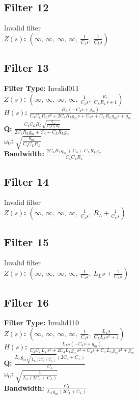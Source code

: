 \documentclass{article}
\begin{document}
\subsection*{Filter 12}
Invalid filter \\ 
\textbf{$Z(s)$:} $\left( \infty, \  \infty, \  \infty, \  \infty, \  \frac{1}{C_{4} s}, \  \frac{1}{C_{L} s}\right)$ \\ 
\subsection*{Filter 13}
\textbf{Filter Type:} Invalid011 \\ 
\textbf{$Z(s)$:} $\left( \infty, \  \infty, \  \infty, \  \infty, \  \frac{1}{C_{4} s}, \  \frac{R_{L}}{C_{L} R_{L} s + 1}\right)$ \\ 
\textbf{$H(s)$:} $\frac{R_{L} \left(- C_{4} s + g_{m}\right)}{C_{4} C_{L} R_{L} s^{2} + 2 C_{4} R_{L} g_{m} s + C_{4} s + C_{L} R_{L} g_{m} s + g_{m}}$ \\ 
\textbf{Q:} $\frac{C_{4} C_{L} R_{L} \sqrt{\frac{g_{m}}{C_{4} C_{L} R_{L}}}}{2 C_{4} R_{L} g_{m} + C_{4} + C_{L} R_{L} g_{m}}$ \\ 
\textbf{$\omega_0$:} $\sqrt{\frac{g_{m}}{C_{4} C_{L} R_{L}}}$ \\ 
\textbf{Bandwidth:} $\frac{2 C_{4} R_{L} g_{m} + C_{4} + C_{L} R_{L} g_{m}}{C_{4} C_{L} R_{L}}$ \\ 
\subsection*{Filter 14}
Invalid filter \\ 
\textbf{$Z(s)$:} $\left( \infty, \  \infty, \  \infty, \  \infty, \  \frac{1}{C_{4} s}, \  R_{L} + \frac{1}{C_{L} s}\right)$ \\ 
\subsection*{Filter 15}
Invalid filter \\ 
\textbf{$Z(s)$:} $\left( \infty, \  \infty, \  \infty, \  \infty, \  \frac{1}{C_{4} s}, \  L_{L} s + \frac{1}{C_{L} s}\right)$ \\ 
\subsection*{Filter 16}
\textbf{Filter Type:} Invalid110 \\ 
\textbf{$Z(s)$:} $\left( \infty, \  \infty, \  \infty, \  \infty, \  \frac{1}{C_{4} s}, \  \frac{L_{L} s}{C_{L} L_{L} s^{2} + 1}\right)$ \\ 
\textbf{$H(s)$:} $\frac{L_{L} s \left(- C_{4} s + g_{m}\right)}{C_{4} C_{L} L_{L} s^{3} + 2 C_{4} L_{L} g_{m} s^{2} + C_{4} s + C_{L} L_{L} g_{m} s^{2} + g_{m}}$ \\ 
\textbf{Q:} $\frac{L_{L} g_{m} \sqrt{\frac{1}{L_{L} \left(2 C_{4} + C_{L}\right)}} \left(2 C_{4} + C_{L}\right)}{C_{4}}$ \\ 
\textbf{$\omega_0$:} $\sqrt{\frac{1}{L_{L} \left(2 C_{4} + C_{L}\right)}}$ \\ 
\textbf{Bandwidth:} $\frac{C_{4}}{L_{L} g_{m} \left(2 C_{4} + C_{L}\right)}$ \\ 
\end{document}
